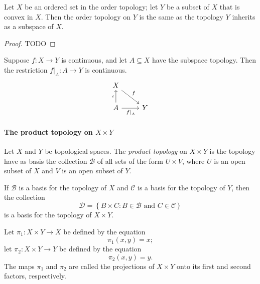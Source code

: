 \begin{theorem}
  Let \( X \) be an ordered set in the order topology;
  let \( Y \) be a subset of \( X \) that is convex in \( X \).
  Then the order topology on \( Y \) is the same as the topology \( Y \) inherits as a subspace of \( X \).
\end{theorem}
\begin{proof}
  TODO
\end{proof}

\begin{theorem}
  Suppose \( f: X \to Y \) is continuous, and let \( A \subseteq X \) have the subspace topology.
  Then the restriction \( \left. f \right\vert_{A}: A \to Y \) is continuous.
  \[\begin{tikzcd}
    X \\
    A & Y
    \arrow["\iota", from=2-1, to=1-1]
    \arrow["f", from=1-1, to=2-2]
    \arrow["{\left. f \right\vert_A}"', from=2-1, to=2-2]
  \end{tikzcd}\]
\end{theorem}

\paragraph{The product topology on \( X \times Y \)}

\begin{definition}
  Let \( X \) and \( Y \) be topological spaces.
  The \emph{product topology} on \( X \times Y \) is the topology have as basis the collection \( \mathcal{B} \) of all sets of the form \( U \times V \), where \( U \) is an open subset of \( X \) and \( V \) is an open subset of \( Y \).
\end{definition}

\begin{theorem}
  If \( \mathcal{B} \) is a basis for the topology of \( X \) and \( \mathcal{C} \) is a basis for the topology of \( Y \), then the collection
  \[
    \mathcal{D} = \left\lbrace B \times C: B \in \mathcal{B} \text{ and } C \in \mathcal{C} \right\rbrace
  \]
  is a basis for the topology of \( X \times Y \).
\end{theorem}

\begin{definition}
  Let \( \pi_1: X \times Y \to X \) be defined by the equation
  \[
    \pi_1(x, y) = x;
  \]
  let \( \pi_2: X \times Y \to Y \) be defined by the equation
  \[
    \pi_2(x, y) = y.
  \]
  The maps \( \pi_1 \) and \( \pi_2 \) are called the projections of \( X \times Y \) onto its first and second factors, respectively.
\end{definition}

